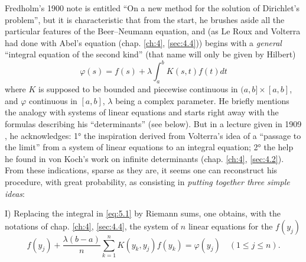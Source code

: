 \documentclass[12pt,a4paper,leqno,twoside]{extbook}
\begin{document}
Fredholm's 1900 note is entitled ``On a new method for the solution of Dirichlet's problem'', but it is characteristic that from the start, he brushes aside all the particular features of the Beer--Neumann equation, and (as Le Roux and Volterra had done with Abel's equation (chap. \ref{ch:4}, \ref{sec:4.4})) begins with a \emph{general} ``integral equation of the second kind'' (that name will only be given by Hilbert)
\begin{equation}
    \label{eq:5.1}
    \varphi(s) = f(s) + \lambda \int_a^b K(s, t) f(t) dt
\end{equation}
where \(K\) is supposed to be bounded and piecewise continuous in \((a, b] \times [a, b]\), and \(\varphi\) continuous in \([a, b]\), \(\lambda\) being a complex parameter. He briefly mentions the analogy with systems of linear equations and starts right away with the formulas describing his ``determinants'' (see below). But in a lecture given in 1909 \cite[p.~123--131]{074}, he acknowledges: 1° the inspiration derived from Volterra's idea of a ``passage to the limit'' from a system of linear equations to an integral equation; 2° the help he found in von Koch's work on infinite determinants (chap. \ref{ch:4}, \ref{sec:4.2}). From these indications, sparse as they are, it seems one can reconstruct his procedure, with great probability, as consisting in \emph{putting together three simple ideas}:

I) Replacing the integral in \eqref{eq:5.1} by Riemann sums, one obtains, with the notations of chap. \ref{ch:4}, \ref{sec:4.4}, the system of \(n\) linear equations for the \(f(y_j)\)
\begin{equation}
    \label{eq:5.2}
    f(y_j) + \frac{\lambda (b-a)}{n} \sum_{k=1}^n K(y_k, y_j) f(y_k) = \varphi(y_j) \quad (1 \leq j \leq n).
\end{equation}
\end{document}
